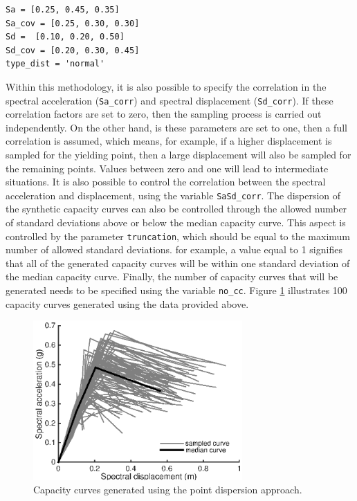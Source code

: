 \begin{Verbatim}[frame=single, commandchars=\\\{\}, samepage=true]
Sa = [0.25, 0.45, 0.35]
Sa_cov = [0.25, 0.30, 0.30]
Sd =  [0.10, 0.20, 0.50]
Sd_cov = [0.20, 0.30, 0.45]
type_dist = 'normal'
\end{Verbatim}

Within this methodology, it is also possible to specify the correlation in the spectral acceleration (\verb=Sa_corr=) and spectral displacement (\verb=Sd_corr=). If these correlation factors are set to zero, then the sampling process is carried out independently. On the other hand, is these parameters are set to one, then a full correlation is assumed, which means, for example, if a higher displacement is sampled for the yielding point, then a large displacement will also be sampled for the remaining points. Values between zero and one will lead to intermediate situations. It is also possible to control the correlation between the spectral acceleration and displacement, using the variable \verb=SaSd_corr=.
The dispersion of the synthetic capacity curves can also be controlled through the allowed number of standard deviations above or below the median capacity curve. This aspect is controlled by the parameter \verb=truncation=, which should be equal to the maximum number of allowed standard deviations. for example, a value equal to 1 signifies that all of the generated capacity curves will be within one standard deviation of the median capacity curve. Finally, the number of capacity curves that will be generated needs to be specified using the variable \verb=no_cc=. Figure \ref{fig:dispersion_cc} illustrates 100 capacity curves generated using the data provided above.

\begin{figure}[htb]
  \centering
      \includegraphics[width=8cm]{Figures/dispersion_cc.eps}
  \caption{Capacity curves generated using the point dispersion approach.}
  \label{fig:dispersion_cc}
\end{figure}